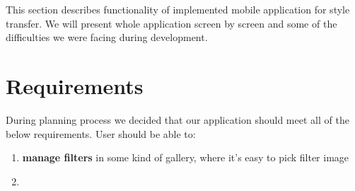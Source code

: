 \documentclass[../Main.tex]{subfiles}
\begin{document}
This section describes functionality of implemented mobile application for 
style transfer. We will present whole application screen by screen and some
of the difficulties we were facing during development.

\section{Requirements}
During planning process we decided that our application should meet all of the 
below requirements.
User should be able to:
\begin{enumerate}
    \item \textbf{manage filters} in some kind of gallery, where it's easy to pick filter image
    \item \textbf{}
\end{enumerate}
\end{document}
